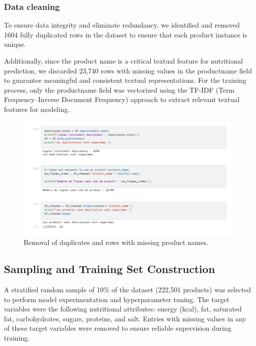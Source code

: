 \subsubsection{Data cleaning}
To ensure data integrity and eliminate redundancy, we identified and removed 1604 fully duplicated rows in the dataset to ensure that each product instance is unique.
\par Additionally, since the product name is a critical textual feature for nutritional prediction, we discarded 23,740 rows with missing values in the product\textunderscore name field to guarantee meaningful and consistent textual representations. For the training process, only the product\textunderscore name field was vectorized using the TF-IDF (Term Frequency–Inverse Document Frequency) approach to extract relevant textual features for modeling.

\begin{figure}[H]
\centering
\includegraphics[scale=0.44]{images/data_cleaning.png}
\caption{Removal of duplicates and rows with missing product names.}
\label{fig:data_cleaning}
\end{figure}

\subsection{Sampling and Training Set Construction}
A stratified random sample of 10\% of the dataset (222,501 products) was selected to perform model experimentation and hyperparameter tuning. The target variables were the following nutritional attributes: energy (kcal), fat, saturated fat, carbohydrates, sugars, proteins, and salt.
Entries with missing values in any of these target variables were removed to ensure reliable supervision during training.

